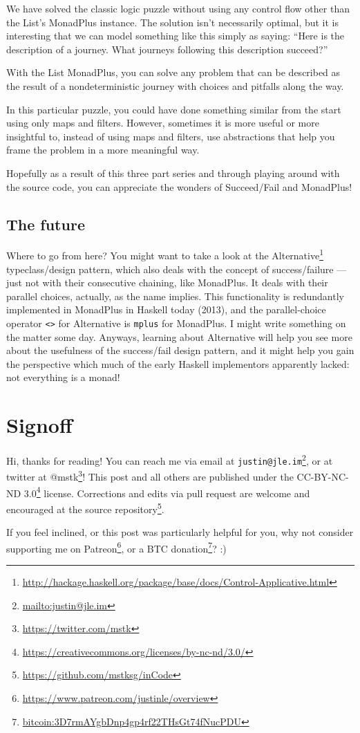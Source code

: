 \documentclass[]{article}
\renewcommand{\href}[2]{#2\footnote{\url{#1}}}
\begin{document}
We have solved the classic logic puzzle without using any control flow other
than the List's MonadPlus instance. The solution isn't necessarily optimal, but
it is interesting that we can model something like this simply as saying: ``Here
is the description of a journey. What journeys following this description
succeed?''

With the List MonadPlus, you can solve any problem that can be described as the
result of a nondeterministic journey with choices and pitfalls along the way.

In this particular puzzle, you could have done something similar from the start
using only maps and filters. However, sometimes it is more useful or more
insightful to, instead of using maps and filters, use abstractions that help you
frame the problem in a more meaningful way.

Hopefully as a result of this three part series and through playing around with
the source code, you can appreciate the wonders of Succeed/Fail and MonadPlus!

\hypertarget{the-future}{%
\subsection{The future}\label{the-future}}

Where to go from here? You might want to take a look at the
\href{http://hackage.haskell.org/package/base/docs/Control-Applicative.html}{Alternative}
typeclass/design pattern, which also deals with the concept of success/failure
--- just not with their consecutive chaining, like MonadPlus. It deals with
their parallel choices, actually, as the name implies. This functionality is
redundantly implemented in MonadPlus in Haskell today (2013), and the
parallel-choice operator \texttt{\textless{}\textbar{}\textgreater{}} for
Alternative is \texttt{mplus} for MonadPlus. I might write something on the
matter some day. Anyways, learning about Alternative will help you see more
about the usefulness of the success/fail design pattern, and it might help you
gain the perspective which much of the early Haskell implementors apparently
lacked: not everything is a monad!

\hypertarget{signoff}{%
\section{Signoff}\label{signoff}}

Hi, thanks for reading! You can reach me via email at
\href{mailto:justin@jle.im}{\nolinkurl{justin@jle.im}}, or at twitter at
\href{https://twitter.com/mstk}{@mstk}! This post and all others are published
under the \href{https://creativecommons.org/licenses/by-nc-nd/3.0/}{CC-BY-NC-ND
3.0} license. Corrections and edits via pull request are welcome and encouraged
at \href{https://github.com/mstksg/inCode}{the source repository}.

If you feel inclined, or this post was particularly helpful for you, why not
consider \href{https://www.patreon.com/justinle/overview}{supporting me on
Patreon}, or a \href{bitcoin:3D7rmAYgbDnp4gp4rf22THsGt74fNucPDU}{BTC donation}?
:)
\end{document}
